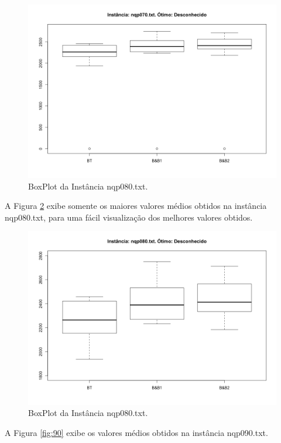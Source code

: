 \documentclass[12pt]{article}
\begin{document}
	\begin{figure}[H]
		\centering
		\includegraphics[width=0.9\linewidth]{img/80}
		\caption{BoxPlot da Instância nqp080.txt.}
		\label{fig:80}
	\end{figure}

	A Figura \ref{fig:80-2} exibe somente os maiores valores médios obtidos na instância nqp080.txt, para uma fácil visualização dos melhores valores obtidos.

	\begin{figure}[H]
		\centering
		\includegraphics[width=0.9\linewidth]{img/80-2}
		\caption{BoxPlot da Instância nqp080.txt.}
		\label{fig:80-2}
	\end{figure}

	A Figura \ref{fig:90} exibe os valores médios obtidos na instância nqp090.txt.
\end{document}
